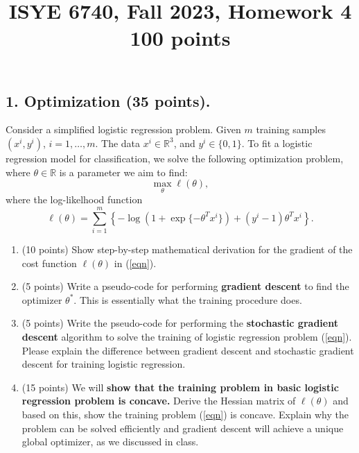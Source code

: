 \documentclass[twoside,10pt]{article}
\begin{document}
\title{ISYE 6740, Fall 2023, Homework 4\\ 
  100 points}
\date{}
\maketitle




\subsection*{1. Optimization (35 points).}

Consider a simplified logistic regression problem. 
Given $m$ training samples $(x^i, y^i)$, $i = 1, \ldots, m$. The data $x^i \in \mathbb R^3$, and $y^i \in \{0, 1\}$.  To fit a logistic regression model for classification, we solve the following optimization problem, where $\theta \in \mathbb R$ is a parameter we aim to find:
\begin{equation}
\max_\theta \ell (\theta), \label{eqn}
\end{equation}
where the log-likelhood function \[\ell(\theta) = \sum_{i=1}^m \left\{-\log (1+\exp\{-\theta^T x^i\}) + (y^i-1) \theta^T x^i\right\}.\]

\begin{enumerate}
\item (10 points) Show step-by-step mathematical derivation for the gradient of the cost function $\ell(\theta)$ in (\ref{eqn}).
\item (5 points) Write a pseudo-code  for performing {\bf gradient descent} to find the optimizer $\theta^*$. This is essentially what the training procedure does. 
\item (5 points) Write the pseudo-code for performing the {\bf stochastic gradient descent} algorithm to solve the training of logistic regression problem (\ref{eqn}). Please explain the difference between gradient descent and stochastic gradient descent for training logistic regression.
\item (15 points) We will {\bf show that the training problem in basic logistic regression problem is concave.} Derive the Hessian matrix of $\ell(\theta)$ and based on this, show the training problem (\ref{eqn}) is concave. Explain why the problem can be solved efficiently and gradient descent will achieve a unique global optimizer, as we discussed in class. 
\end{enumerate}
\end{document}
